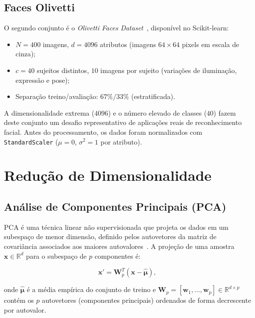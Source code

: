 \documentclass[12pt, a4paper]{article}
\newcommand{\bx}{\mathbf{x}}
\newcommand{\bmu}{\boldsymbol{\mu}}
\newcommand{\bW}{\mathbf{W}}
\begin{document}
\subsection{Faces Olivetti}

O segundo conjunto é o \emph{Olivetti Faces Dataset}~\cite{samaria1994}, disponível no Scikit-learn:

\begin{itemize}
    \item $N = 400$ imagens, $d = 4096$ atributos (imagens $64 \times 64$ pixels em escala de cinza);
    \item $c = 40$ sujeitos distintos, $10$ imagens por sujeito (variações de iluminação, expressão e pose);
    \item Separação treino/avaliação: $67\%/33\%$ (estratificada).
\end{itemize}

A dimensionalidade extrema ($4096$) e o número elevado de classes ($40$) fazem deste conjunto um desafio representativo de aplicações reais de reconhecimento facial. Antes do processamento, os dados foram normalizados com \texttt{StandardScaler} ($\mu=0$, $\sigma^2=1$ por atributo).

\section{Redução de Dimensionalidade}
\label{sec:reducao}

\subsection{Análise de Componentes Principais (PCA)}
\label{sec:pca}

PCA é uma técnica linear não supervisionada que projeta os dados em um subespaço de menor dimensão, definido pelos autovetores da matriz de covariância associados aos maiores autovalores~\cite{bishop2006}. A projeção de uma amostra $\bx \in \mathbb{R}^d$ para o subespaço de $p$ componentes é:

\begin{equation}
    \bx' = \bW_p^T (\bx - \hat{\bmu}),
    \label{eq:pca}
\end{equation}

\noindent onde $\hat{\bmu}$ é a média empírica do conjunto de treino e $\bW_p = [\mathbf{w}_1, \ldots, \mathbf{w}_p] \in \mathbb{R}^{d \times p}$ contém os $p$ autovetores (componentes principais) ordenados de forma decrescente por autovalor.
\end{document}
